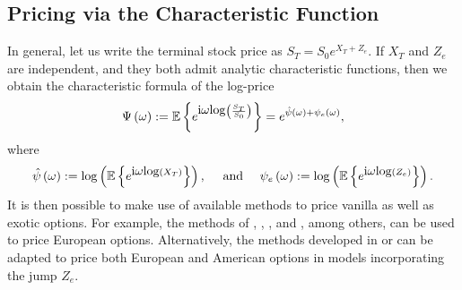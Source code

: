 \documentclass[11pt]{article}
\numberwithin{equation}{section}
\numberwithin{theorem}{section}
\begin{document}
\subsection{Pricing via the Characteristic Function\label{sub:fourier}}

In general, let us write  the terminal stock price as $S_T = S_0 e^{X_T + Z_e}$. If $X_{T}$ and $Z_{e}$ are  independent, and they both 
admit analytic characteristic functions, then we  obtain the characteristic formula of the log-price  
\[
\Psi\left(\omega\right):=\mathbb{E}\left\{e^{\mbox{i\ensuremath{\omega}log}\left(\frac{S_{T}}{S_0}\right)}\right\} = e^{\hat{\psi}\left(\omega\right)+\psi_{e}\left(\omega\right)},  
\]
where \[\hat{\psi}\left(\omega\right):={\log}\left(\mathbb{E}\left\{ e^{\mbox{i\ensuremath{\omega}log}\left(X_{T}\right)}\right\} \right), \quad \text{ and } \quad  \psi_{e}\left(\omega\right):={\log}\left(\mathbb{E}\left\{ e^{\mbox{i\ensuremath{\omega}log}\left(Z_{e}\right)}\right\} \right).\]
It is then possible to make use of available methods to price vanilla
as well as exotic options. For example, the methods of \citet{Carr1999}, \cite{Duffie2000}, \cite{Lee2004}, 
and \citet{Raible2000}, among others,  can be used to price European options. Alternatively,
the methods developed  in \citet{Jackson2008} or \citet{Lord08afast} can be adapted to price
both European and American options in models incorporating the jump
$Z_{e}$. 
\end{document}
